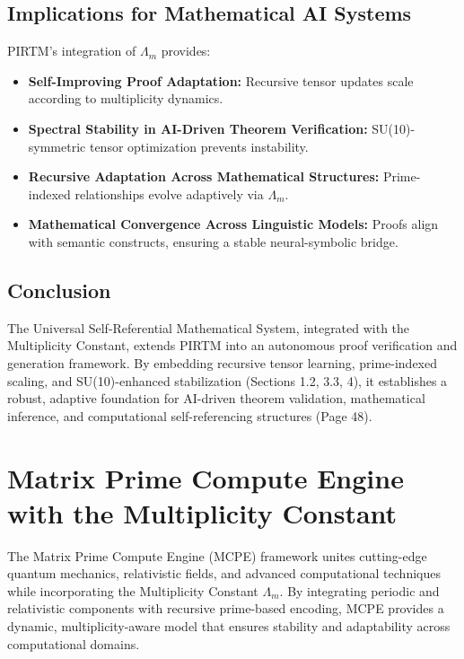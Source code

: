 \documentclass{article}
\theoremstyle{plain}
\begin{document}
\subsection{Implications for Mathematical AI Systems}
PIRTM’s integration of \( \Lambda_m \) provides:
\begin{itemize}
    \item \textbf{Self-Improving Proof Adaptation:} Recursive tensor updates scale according to multiplicity dynamics.
    \item \textbf{Spectral Stability in AI-Driven Theorem Verification:} SU(10)-symmetric tensor optimization prevents instability.
    \item \textbf{Recursive Adaptation Across Mathematical Structures:} Prime-indexed relationships evolve adaptively via \( \Lambda_m \).
    \item \textbf{Mathematical Convergence Across Linguistic Models:} Proofs align with semantic constructs, ensuring a stable neural-symbolic bridge.
\end{itemize}

\subsection{Conclusion}
The Universal Self-Referential Mathematical System, integrated with the Multiplicity Constant, extends PIRTM into an autonomous proof verification and generation framework. By embedding recursive tensor learning, prime-indexed scaling, and SU(10)-enhanced stabilization (Sections 1.2, 3.3, 4), it establishes a robust, adaptive foundation for AI-driven theorem validation, mathematical inference, and computational self-referencing structures (Page 48).


\section{Matrix Prime Compute Engine with the Multiplicity Constant}

The Matrix Prime Compute Engine (MCPE) framework unites cutting-edge quantum mechanics, relativistic fields, and advanced computational techniques while incorporating the Multiplicity Constant \( \Lambda_m \). By integrating periodic and relativistic components with recursive prime-based encoding, MCPE provides a dynamic, multiplicity-aware model that ensures stability and adaptability across computational domains.
\end{document}
